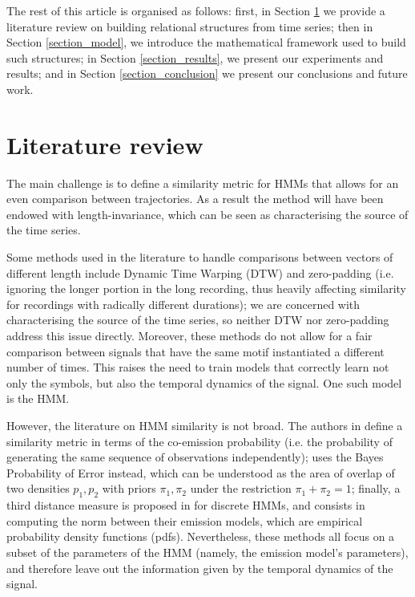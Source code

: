 \documentclass[pdftex,11pt,a4paper]{article}
\theoremstyle{definition}
\theoremstyle{remark}
\begin{document}
\par The rest of this article is organised as follows: first, in Section \ref{section_review} we provide a literature review on building relational structures from time series; then in Section \ref{section_model}, we introduce the mathematical framework used to build such structures; in Section \ref{section_results}, we present our experiments and results; and in Section \ref{section_conclusion} we present our conclusions and future work.

\section{Literature review}
\label{section_review}
The main challenge is to define a similarity metric for HMMs that allows for an even comparison between trajectories. As a result the method will have been endowed with length-invariance, which can be seen as characterising the source of the time series.
\par Some methods used in the literature to handle comparisons between vectors of different length include Dynamic Time Warping (DTW) \cite{Jancovic2013,Muda2010} and zero-padding (i.e. ignoring the longer portion in the long recording, thus heavily affecting similarity for recordings with radically different durations); we are concerned with characterising the source of the time series, so neither DTW nor zero-padding address this issue directly. Moreover, these methods do not allow for a fair comparison between signals that have the same motif instantiated a different number of times. This raises the need to train models that correctly learn not only the symbols, but also the temporal dynamics of the signal. One such model is the HMM.
\par However, the literature on HMM similarity is not broad. The authors in \cite{Lyngs1999} define a similarity metric in terms of the co-emission probability (i.e. the probability of generating the same sequence of observations independently); \cite{Bahlmann2001} uses the Bayes Probability of Error instead, which can be understood as the area of overlap of two densities $p_1, p_2$ with priors $\pi_1, \pi_2$ under the restriction $\pi_1+\pi_2 = 1$; finally, a third distance measure is proposed in \cite{Juang1985} for discrete HMMs, and consists in computing the norm between their emission models, which are empirical probability density functions (pdfs). Nevertheless, these methods all focus on a subset of the parameters of the HMM (namely, the emission model's parameters), and therefore leave out the information given by the temporal dynamics of the signal.
\end{document}
